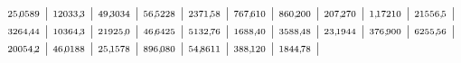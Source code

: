 \documentclass[12pt]{article}
\theoremstyle{aufg}
\theoremstyle{bsp}
\begin{document}
\begin{flushleft}
$ \scriptstyle25,\hspace{-1pt}0589$ | $ \scriptstyle12033,\hspace{-1pt}3$ | $ \scriptstyle49,\hspace{-1pt}3034$ | $ \scriptstyle56,\hspace{-1pt}5228$ | $ \scriptstyle2371,\hspace{-1pt}58$ | $ \scriptstyle767,\hspace{-1pt}610$ | $ \scriptstyle860,\hspace{-1pt}200$ | $ \scriptstyle207,\hspace{-1pt}270$ | $ \scriptstyle1,\hspace{-1pt}17210$ | $ \scriptstyle21556,\hspace{-1pt}5$ | $ \scriptstyle3264,\hspace{-1pt}44$ | $ \scriptstyle10364,\hspace{-1pt}3$ | $ \scriptstyle21925,\hspace{-1pt}0$ | $ \scriptstyle46,\hspace{-1pt}6425$ | $ \scriptstyle5132,\hspace{-1pt}76$ | $ \scriptstyle1688,\hspace{-1pt}40$ | $ \scriptstyle3588,\hspace{-1pt}48$ | $ \scriptstyle23,\hspace{-1pt}1944$ | $ \scriptstyle376,\hspace{-1pt}900$ | $ \scriptstyle6255,\hspace{-1pt}56$ | $ \scriptstyle20054,\hspace{-1pt}2$ | $ \scriptstyle46,\hspace{-1pt}0188$ | $ \scriptstyle25,\hspace{-1pt}1578$ | $ \scriptstyle896,\hspace{-1pt}080$ | $ \scriptstyle54,\hspace{-1pt}8611$ | $ \scriptstyle388,\hspace{-1pt}120$ | $ \scriptstyle1844,\hspace{-1pt}78$ | \end{flushleft} 
    
\end{document}
